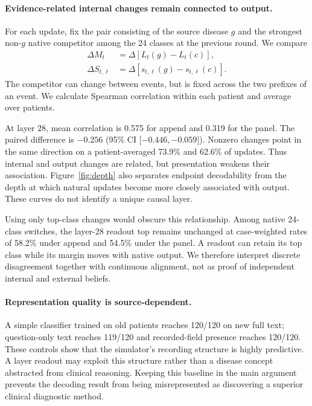 \documentclass[11pt]{article}
\begin{document}
\paragraph{Evidence-related internal changes remain connected to output.}
For each update, fix the pair consisting of the source disease $g$ and the strongest non-$g$ native competitor among the 24 classes at the previous round. We compare
\begin{align}
\Delta M_t &= \Delta[L_t(g)-L_t(c)],\\
\Delta S_{t,\ell} &= \Delta[s_{t,\ell}(g)-s_{t,\ell}(c)].
\end{align}
The competitor can change between events, but is fixed across the two prefixes of an event. We calculate Spearman correlation within each patient and average over patients.

At layer 28, mean correlation is 0.575 for append and 0.319 for the panel. The paired difference is $-0.256$ (95\% CI [$-0.446,-0.059$]). Nonzero changes point in the same direction on a patient-averaged 73.9\% and 62.6\% of updates. Thus internal and output changes are related, but presentation weakens their association. Figure~\ref{fig:depth} also separates endpoint decodability from the depth at which natural updates become more closely associated with output. These curves do not identify a unique causal layer.

Using only top-class changes would obscure this relationship. Among native 24-class switches, the layer-28 readout top remains unchanged at case-weighted rates of 58.2\% under append and 54.5\% under the panel. A readout can retain its top class while its margin moves with native output. We therefore interpret discrete disagreement together with continuous alignment, not as proof of independent internal and external beliefs.

\paragraph{Representation quality is source-dependent.}
A simple classifier trained on old patients reaches 120/120 on new full text; question-only text reaches 119/120 and recorded-field presence reaches 120/120. These controls show that the simulator's recording structure is highly predictive. A layer readout may exploit this structure rather than a disease concept abstracted from clinical reasoning. Keeping this baseline in the main argument prevents the decoding result from being misrepresented as discovering a superior clinical diagnostic method.
\end{document}
